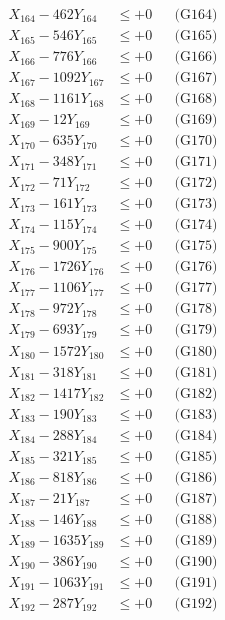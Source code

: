 \documentclass[a4paper,10pt]{article}
\begin{document}
{\begin{align}
X_{164} - 462Y_{164} &\leq +0 && \text{(G164)} \\
X_{165} - 546Y_{165} &\leq +0 && \text{(G165)} \\
X_{166} - 776Y_{166} &\leq +0 && \text{(G166)} \\
X_{167} - 1092Y_{167} &\leq +0 && \text{(G167)} \\
X_{168} - 1161Y_{168} &\leq +0 && \text{(G168)} \\
X_{169} - 12Y_{169} &\leq +0 && \text{(G169)} \\
X_{170} - 635Y_{170} &\leq +0 && \text{(G170)} \\
\allowbreak
X_{171} - 348Y_{171} &\leq +0 && \text{(G171)} \\
X_{172} - 71Y_{172} &\leq +0 && \text{(G172)} \\
X_{173} - 161Y_{173} &\leq +0 && \text{(G173)} \\
X_{174} - 115Y_{174} &\leq +0 && \text{(G174)} \\
X_{175} - 900Y_{175} &\leq +0 && \text{(G175)} \\
X_{176} - 1726Y_{176} &\leq +0 && \text{(G176)} \\
X_{177} - 1106Y_{177} &\leq +0 && \text{(G177)} \\
X_{178} - 972Y_{178} &\leq +0 && \text{(G178)} \\
X_{179} - 693Y_{179} &\leq +0 && \text{(G179)} \\
X_{180} - 1572Y_{180} &\leq +0 && \text{(G180)} \\
\allowbreak
X_{181} - 318Y_{181} &\leq +0 && \text{(G181)} \\
X_{182} - 1417Y_{182} &\leq +0 && \text{(G182)} \\
X_{183} - 190Y_{183} &\leq +0 && \text{(G183)} \\
X_{184} - 288Y_{184} &\leq +0 && \text{(G184)} \\
X_{185} - 321Y_{185} &\leq +0 && \text{(G185)} \\
X_{186} - 818Y_{186} &\leq +0 && \text{(G186)} \\
X_{187} - 21Y_{187} &\leq +0 && \text{(G187)} \\
X_{188} - 146Y_{188} &\leq +0 && \text{(G188)} \\
X_{189} - 1635Y_{189} &\leq +0 && \text{(G189)} \\
X_{190} - 386Y_{190} &\leq +0 && \text{(G190)} \\
\allowbreak
X_{191} - 1063Y_{191} &\leq +0 && \text{(G191)} \\
X_{192} - 287Y_{192} &\leq +0 && \text{(G192)} \\

\end{align}}
\end{document}

